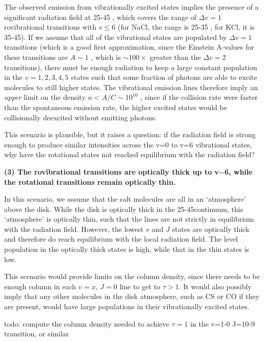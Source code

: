 \documentclass[twocolumn]{aastex62}
\begin{document}
The observed emission from vibrationally excited states implies the presence of
a significant radiation field at 25-45 \um, which covers the range of
$\Delta v=1$ rovibrational transitions with $v\leq6$ (for NaCl, the range is
25-35 \um, for KCl, it is 35-45\um).  If we assume that all of the vibrational
states are populated by $\Delta v=1$ transitions (which is a good first
approximation, since the Einstein A-values for these transitions are $A\sim1$
\pers, which is $\sim100\times$ greater than the $\Delta v=2$ transitions),
there must be enough radiation to keep a large constant population in the $v=1,
2, 3, 4, 5$ states such that some fraction of photons are able to excite
molecules to still higher states.   The vibrational emission lines therefore
imply an \emph{upper} limit on the density $n<A/C\sim10^{10}$ \percc, since if
the collision rate were faster than the spontaneous emission rate, the higher
excited states would be collisionally deexcited without emitting photons.


This scenario is plausible, but it raises a question: if the radiation field is
strong enough to produce similar intensities across the v=0 to v=6 vibrational
states, why have the rotational states not reached equilibrium with the radiation
field?

\textbf{(3) The rovibrational transitions are optically thick up to
v$\sim$6, while the rotational transitions remain optically thin.}

In this scenario, we assume that the salt molecules are all in an `atmosphere'
above the disk.  While the disk is optically thick in the 25-45\um continuum,
this `atmosphere' is optically thin, such that the lines are not strictly in
equilibrium with the radiation field.  However, the lowest $v$ and $J$ states are
optically thick and therefore do reach equilibrium with the local radiation
field.  The level population in the optically thick states is high, while that in the
thin states is low.  

This scenario would provide limits on the column density, since there
needs to be enough column in each $v=x$, $J=0$ line to get to $\tau>1$. 
It would also possibly imply that any other molecules in the disk atmosphere,
such as CS or CO if they are present, would have large populations in their
vibrationally excited states.

{\color{red} todo: compute the column density needed to achieve $\tau=1$ in the
v=1-0 J=10-9 transition, or similar}
\end{document}
